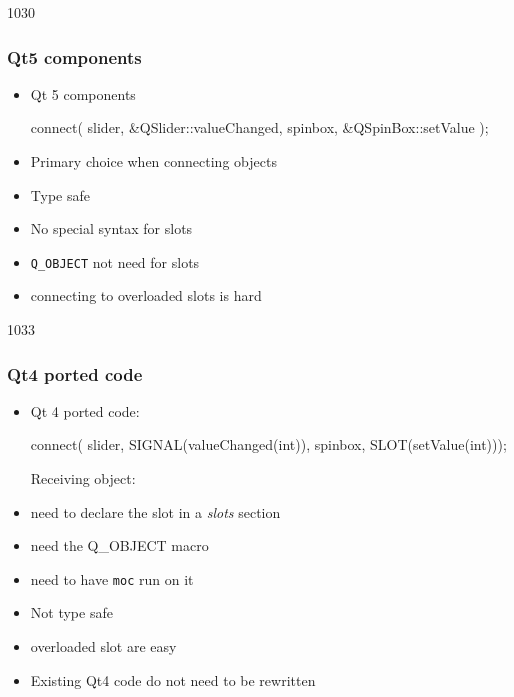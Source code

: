 \newcommand{\advantage}{\hspace{-5mm}\makebox[6mm]{\correct}}
\newcommand{\disadvantage}{\hspace{-5mm}\makebox[6mm]{\incorrect}}
\begin{slide}[fragile]{1030}\frametitle{Qt5 components}
  \begin{itemize}
\item Qt 5 components
\begin{cpp}
connect( slider, &QSlider::valueChanged,
         spinbox, &QSpinBox::setValue );
\end{cpp}\medskip
\item Primary choice when connecting objects\medskip
\item[]\advantage Type safe
\item[]\advantage No special syntax for slots
\item[]\advantage \texttt{Q\_OBJECT} not need for slots
\item[]\disadvantage connecting to overloaded slots is hard
  \end{itemize}
\end{slide}


\begin{slide}[fragile]{1033}\frametitle{Qt4 ported code}
  \begin{itemize}
  \item Qt 4 ported code:\\
\begin{cpp}
connect( slider, SIGNAL(valueChanged(int)), 
         spinbox, SLOT(setValue(int)));
\end{cpp}\medskip
\hspace{-3mm}Receiving object: 
\item[]\disadvantage need to declare the slot in a \textit{slots}
  section
\item[]\disadvantage need the Q\_OBJECT macro
\item[]\disadvantage need to have \texttt{moc} run on it\bigskip

\item[]\disadvantage Not type safe
\item[]\advantage overloaded slot are easy
\item[]\advantage Existing Qt4 code do not need to be rewritten
\end{itemize}
\bigskip\bigskip
\end{slide}

